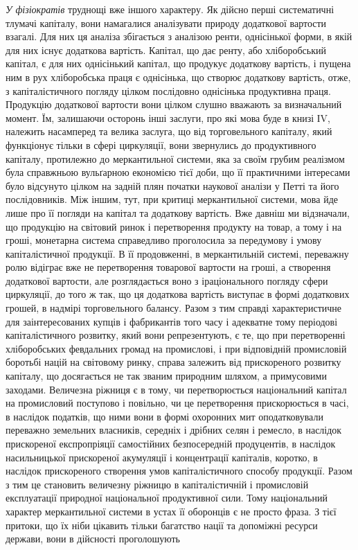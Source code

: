 \emph{У фізіократів} труднощі вже іншого характеру. Як дійсно перші систематичні
тлумачі капіталу, вони намагалися аналізувати природу додаткової вартости
взагалі. Для них ця аналіза збігається з аналізою ренти, однісінької
форми, в якій для них існує додаткова вартість. Капітал, що дає ренту, або
хліборобський капітал, є для них однісінький капітал, що продукує додаткову
вартість, і пущена ним в рух хліборобська праця є однісінька, що створює додаткову
вартість, отже, з капіталістичного погляду цілком послідовно однісінька
продуктивна праця. Продукцію додаткової вартости вони цілком слушно вважають
за визначальний момент. Їм, залишаючи осторонь інші заслуги, про які мова
буде в книзі ІV, належить насамперед та велика заслуга, що від торговельного
капіталу, який функціонує тільки в сфері циркуляції, вони звернулись до продуктивного
капіталу, протилежно до меркантильної системи, яка за своїм грубим
реалізмом була справжньою вульґарною економією тієї доби, що її практичними
інтересами було відсунуто цілком на задній плян початки наукової аналізи
у Петті та його послідовників. Між іншим, тут, при критиці меркантильної системи,
мова йде лише про її погляди на капітал та додаткову вартість. Вже
давніш ми відзначали, що продукцію на світовий ринок і перетворення продукту
на товар, а тому і на гроші, монетарна система справедливо проголосила за передумову
і умову капіталістичної продукції. В її продовженні, в меркантильній системі,
переважну ролю відіграє вже не перетворення товарової вартости на гроші, а створення
додаткової вартости, але розглядається воно з іраціонального погляду сфери
циркуляції, до того ж так, що ця додаткова вартість виступає в формі додаткових
грошей, в надмірі торговельного балансу. Разом з тим справді характеристичне
для заінтересованих купців і фабрикантів того часу і адекватне тому періодові
капіталістичного розвитку, який вони репрезентують, є те, що при перетворенні
хліборобських февдальних громад на промислові, і при відповідній промисловій
боротьбі націй на світовому ринку, справа залежить від прискореного розвитку
капіталу, що досягається не так званим природним шляхом, а примусовими заходами.
Величезна ріжниця є в тому, чи перетворюється національний капітал на промисловий
поступово і повільно, чи це перетворення прискорюється в часі, в наслідок податків,
що ними вони в формі охоронних мит оподатковували переважно земельних
власників, середніх і дрібних селян і ремесло, в наслідок прискореної експропріяції
самостійних безпосередній продуцентів, в наслідок насильницької прискореної
акумуляції і концентрації капіталів, коротко, в наслідок прискореного
створення умов капіталістичного способу продукції. Разом з тим це становить
величезну ріжницю в капіталістичній і промисловій експлуатації природної національної
продуктивної сили. Тому національний характер меркантильної системи
в устах її оборонців є не просто фраза. З тієї притоки, що їх ніби цікавить тільки
багатство нації та допоміжні ресурси держави, вони в дійсності проголошують
\parbreak{}  %
